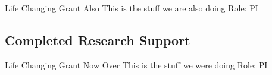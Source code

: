 \documentclass{nihbiosketch}
\begin{document}
      \bigskip
            
      {Life Changing Grant Also}
      {This is the stuff we are also doing}
      {Role: PI}
      
      \bigskip
          
      
  
    \subsection*{Completed Research Support}
  
          
      {Life Changing Grant Now Over}
      {This is the stuff we were doing}
      {Role: PI}
      
      \bigskip
      
  

  
\end{document}
